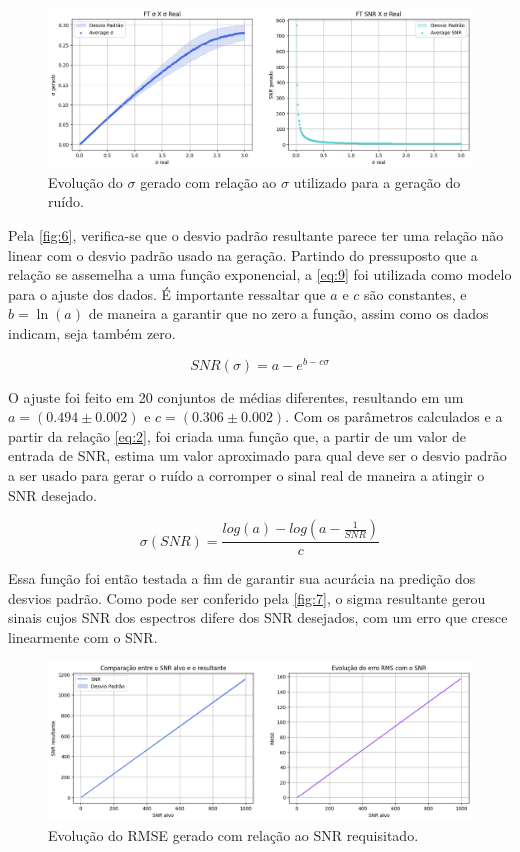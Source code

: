 \documentclass[
12pt,		
twoside, 
a4paper,
chapter=TITLE,
english,			
brazil]{USPSC-classe/USPSC}
\begin{document}
\begin{figure} [H]
    \includegraphics[scale=0.37]{evolucao-sigmas.png}
    \centering
    \caption{Evolução do $\sigma$ gerado com relação ao $\sigma$ utilizado para a geração do ruído.}
    \label{fig:6}
\end{figure}

Pela \autoref{fig:6}, verifica-se que o desvio padrão resultante parece ter uma relação não linear com o desvio padrão usado na geração. Partindo do pressuposto que a relação se assemelha a uma função exponencial, a \autoref{eq:9} foi utilizada como modelo para o ajuste dos dados. É importante ressaltar que 
$a$ e $c$ são constantes, e $b = \ln(a)$ de maneira a garantir que no zero a função, assim como os dados indicam, seja também zero.

\begin{equation} \label{eq:9}
    SNR(\sigma) = a - e^{b - c\sigma} 
\end{equation}

O ajuste foi feito em 20 conjuntos de médias diferentes, resultando em um $a = (0.494 \pm 0.002)$ e $c = (0.306 \pm 0.002)$. Com os parâmetros calculados e a partir da relação \autoref{eq:2}, foi criada uma função que, a partir de um valor de entrada de SNR, estima um valor aproximado para qual deve ser o desvio padrão a ser usado para 
gerar o ruído a corromper o sinal real de maneira a atingir o SNR desejado.

\begin{equation} \label{eq:10}
    \sigma (SNR) = \frac{log(a) - log(a - \frac{1}{SNR})}{c}
\end{equation}

Essa função foi então testada a fim de garantir sua acurácia na predição dos desvios padrão. Como pode ser conferido pela \autoref{fig:7}, o sigma resultante gerou sinais cujos SNR dos espectros difere dos SNR desejados, com um erro que cresce linearmente com o SNR.

\begin{figure} [H]
    \includegraphics[scale=0.5]{evolucao-rmse-errado.png}
    \centering
    \caption{Evolução do RMSE gerado com relação ao SNR requisitado.}
    \label{fig:7}
\end{figure}
\end{document}
